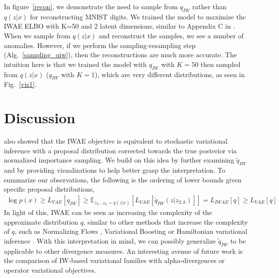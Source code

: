 \documentclass{article} %
\begin{document}
In figure~\ref{recon}, we demonstrate the need to sample from $q_{IW}$ rather than $q(z|x)$ for reconstructing MNIST digits.
We trained the model to maximize the IWAE ELBO with K=50 and 2 latent dimensions, similar to Appendix C in \citet{burda2015importance}.
When we sample from $q(z|x)$ and reconstruct the samples, we see a number of anomalies.
However, if we perform the sampling-resampling step (Alg.~\ref{sampling_qiw}), then the reconstructions are much more accurate.
The intuition here is that we trained the model with $q_{IW}$ with $K=50$ then sampled from $q(z|x)$ ($q_{IW}$ with $K=1$), which are very different distributions, as seen in Fig.~\ref{viz1}.



\section{Discussion}
\cite{bachman} also showed that the IWAE objective is equivalent to stochastic variational inference with a proposal distribution corrected towards the true posterior via normalized importance sampling.
We build on this idea by further examining $\tilde{q}_{IW}$ and by providing visualizations to help better grasp the interpretation.
To summarize our observations, the following is the ordering of lower bounds given specific proposal distributions,
\begin{align} 
    \log p(x) \geq L_{VAE}[q_{IW}] \geq \mathbb{E}_{z_{2} \dots z_{k}\sim q(z|x)} \left[ L_{VAE}[\tilde{q}_{IW}(z|z_{2:k})] \right] = L_{IWAE}[q]  \geq L_{VAE}[q] \nonumber
\end{align}
In light of this, IWAE can be seen as increasing the complexity of the approximate distribution $q$, similar to other methods that increase the complexity of $q$, such as Normalizing Flows \citep{normflow}, Variational Boosting \citep{varboosting} or Hamiltonian variational inference \citep{salimans2015markov}.
With this interpretation in mind, we can possibly generalize $\tilde{q}_{IW}$ to be applicable to other divergence measures.
An interesting avenue of future work is the comparison of IW-based variational families with alpha-divergences or operator variational objectives. 
\end{document}
